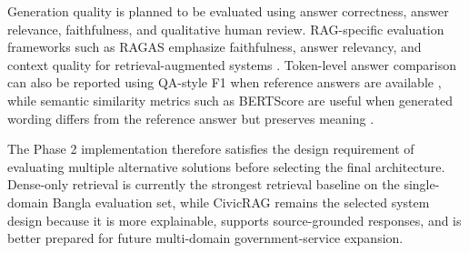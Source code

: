 Generation quality is planned to be evaluated using answer correctness, answer relevance, faithfulness, and qualitative human review. RAG-specific evaluation frameworks such as RAGAS emphasize faithfulness, answer relevancy, and context quality for retrieval-augmented systems \cite{es2024ragas}. Token-level answer comparison can also be reported using QA-style F1 when reference answers are available \cite{rajpurkar2016squad}, while semantic similarity metrics such as BERTScore are useful when generated wording differs from the reference answer but preserves meaning \cite{zhang2020bertscore}.

The Phase 2 implementation therefore satisfies the design requirement of evaluating multiple alternative solutions before selecting the final architecture. Dense-only retrieval is currently the strongest retrieval baseline on the single-domain Bangla evaluation set, while CivicRAG remains the selected system design because it is more explainable, supports source-grounded responses, and is better prepared for future multi-domain government-service expansion.

